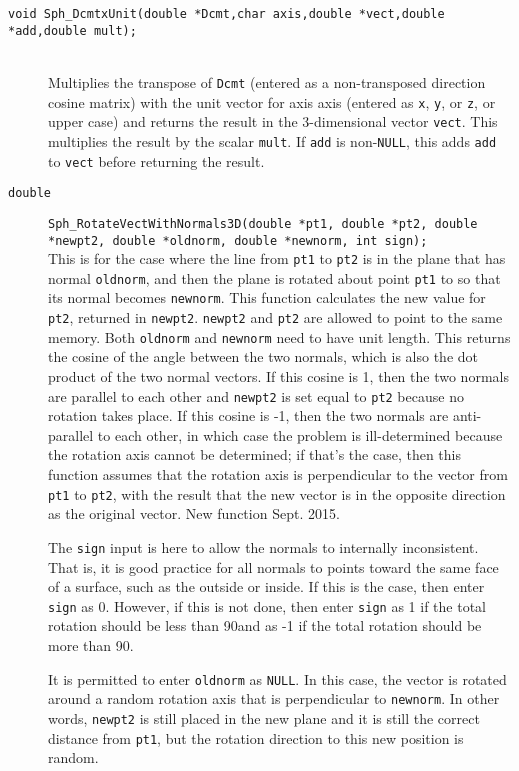 \documentclass[11pt]{article}
\newcommand {\ttt} {\texttt}
\begin{document}
\begin{description}
\item[\ttt{void Sph\_DcmtxUnit(double *Dcmt,char axis,double *vect,double *add,double mult);}]
\hfill \\
Multiplies the transpose of \ttt{Dcmt} (entered as a non-transposed direction cosine matrix) with the unit vector for axis axis (entered as \ttt{x}, \ttt{y}, or \ttt{z}, or upper case) and returns the result in the 3-dimensional vector \ttt{vect}. This multiplies the result by the scalar \ttt{mult}. If \ttt{add} is non-\ttt{NULL}, this adds \ttt{add} to \ttt{vect} before returning the result. 

\item[\ttt{double}]
\ttt{Sph\_RotateVectWithNormals3D(double *pt1, double *pt2, double *newpt2, double *oldnorm, double *newnorm, int sign);}
\hfill \\
This is for the case where the line from \ttt{pt1} to \ttt{pt2} is in the plane that has normal \ttt{oldnorm}, and then the plane is rotated about point \ttt{pt1} to so that its normal becomes \ttt{newnorm}. This function calculates the new value for \ttt{pt2}, returned in \ttt{newpt2}. \ttt{newpt2} and \ttt{pt2} are allowed to point to the same memory. Both \ttt{oldnorm} and \ttt{newnorm} need to have unit length. This returns the cosine of the angle between the two normals, which is also the dot product of the two normal vectors. If this cosine is 1, then the two normals are parallel to each other and \ttt{newpt2} is set equal to \ttt{pt2} because no rotation takes place. If this cosine is -1, then the two normals are anti-parallel to each other, in which case the problem is ill-determined because the rotation axis cannot be determined; if that's the case, then this function assumes that the rotation axis is perpendicular to the vector from \ttt{pt1} to \ttt{pt2}, with the result that the new vector is in the opposite direction as the original vector. New function Sept. 2015.

The \ttt{sign} input is here to allow the normals to internally inconsistent. That is, it is good practice for all normals to points toward the same face of a surface, such as the outside or inside. If this is the case, then enter \ttt{sign} as 0. However, if this is not done, then enter \ttt{sign} as 1 if the total rotation should be less than 90\degree and as -1 if the total rotation should be more than 90\degree.

It is permitted to enter \ttt{oldnorm} as \ttt{NULL}. In this case, the vector is rotated around a random rotation axis that is perpendicular to \ttt{newnorm}. In other words, \ttt{newpt2} is still placed in the new plane and it is still the correct distance from \ttt{pt1}, but the rotation direction to this new position is random.


\end{description}
\end{document}
